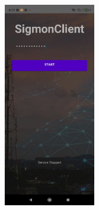 \documentclass{article}
\begin{document}
\includegraphics[width=0.3\textwidth]{stop.jpg}\par\vspace{1cm}





\end{document}

